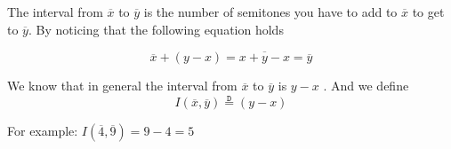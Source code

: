 \documentclass[preview]{standalone}
\begin{document}
\begin{center}
The interval from  $ \overline{x}$ to $ \overline{y }$ is the number of semitones you have to add to $ \overline{x}$ to get to $ \overline{y}$. By noticing that the following equation holds

  \[
	\overline{x}  +  \left( y  -  x \right) = \overline{x  +  y  -  x} = \overline{y}
  \]

  We know that in general the interval from $ \overline{x}$  to $ \overline{y}$ is $y  - x$ . And we define 
  \[
	I\left( \overline{x}, \overline{y}\right) \stackrel{\mathtt{D}}{=} (y  -  x) 
  \]

  For example: $I\left( \overline{4}, \overline{9}\right) = 9  -  4 = 5$
\end{center}
\end{document}
